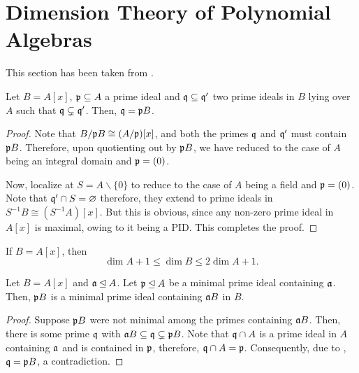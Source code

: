 \section{Dimension Theory of Polynomial Algebras}

This section has been taken from \cite{serre-local-algebra}.

\begin{lemma}
    Let $B = A[x]$, $\mathfrak p\subseteq A$ a prime ideal and $\mathfrak q\subseteq\mathfrak q'$ two prime ideals in $B$ lying over $A$ such that $\mathfrak q\subsetneq\mathfrak q'$. Then, $\mathfrak q = \mathfrak p B$.
\end{lemma}
\begin{proof}
    Note that $B/\mathfrak p B\cong (A/\mathfrak p)[x]$, and both the primes $\mathfrak q$ and $\mathfrak q'$ must contain $\mathfrak p B$. Therefore, upon quotienting out by $\mathfrak p B$, we have reduced to the case of $A$ being an integral domain and $\mathfrak p = (0)$.

    Now, localize at $S = A\backslash\{0\}$ to reduce to the case of $A$ being a field and $\mathfrak p = (0)$. Note that $\mathfrak q'\cap S = \varnothing$ therefore, they extend to prime ideals in $S^{-1}B\cong (S^{-1}A)[x]$. But this is obvious, since any non-zero prime ideal in $A[x]$ is maximal, owing to it being a PID. This completes the proof.
\end{proof}

\begin{theorem}
    If $B = A[x]$, then 
    \begin{equation*}
        \dim A + 1\le \dim B\le 2\dim A + 1.
    \end{equation*}
\end{theorem}

\begin{lemma}
    Let $B = A[x]$ and $\mathfrak a\unlhd A$. Let $\mathfrak p\unlhd A$ be a minimal prime ideal containing $\mathfrak a$. Then, $\mathfrak p B$ is a minimal prime ideal containing $\mathfrak a B$ in $B$.
\end{lemma}
\begin{proof}
    Suppose $\mathfrak p B$ were not minimal among the primes containing $\mathfrak a B$. Then, there is some prime $\mathfrak q$ with $\mathfrak a B\subseteq\mathfrak q\subsetneq\mathfrak p B$. Note that $\mathfrak q\cap A$ is a prime ideal in $A$ containing $\mathfrak a$ and is contained in $\mathfrak p$, therefore, $\mathfrak q\cap A = \mathfrak p$. Consequently, due to , $\mathfrak q = \mathfrak p B$, a contradiction.
\end{proof}

